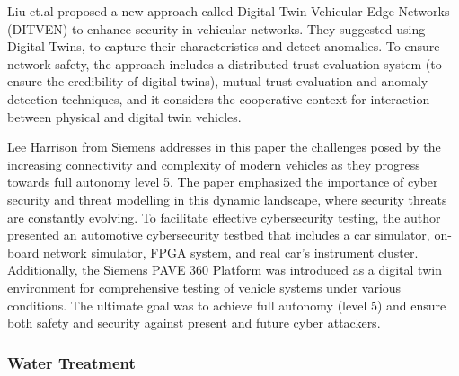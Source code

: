 Liu et.al \cite{liuDistributedCollaborativeAnomaly2021} proposed a new approach called Digital Twin Vehicular Edge Networks (DITVEN) to enhance security in vehicular networks. They suggested using Digital Twins, to capture their characteristics and detect anomalies. To ensure network safety, the approach includes a distributed trust evaluation system (to ensure the credibility of digital twins), mutual trust evaluation and anomaly detection techniques, and it considers the cooperative context for interaction between physical and digital twin vehicles.

Lee Harrison \cite{harrisonCybersecurityThreatModeling2022a} from Siemens addresses in this paper the challenges posed by the increasing connectivity and complexity of modern vehicles as they progress towards full autonomy level 5. The paper emphasized the importance of cyber security and threat modelling in this dynamic landscape, where security threats are constantly evolving. To facilitate effective cybersecurity testing, the author presented an automotive cybersecurity testbed that includes a car simulator, on-board network simulator, FPGA system, and real car's instrument cluster. Additionally, the Siemens PAVE 360 Platform was introduced as a digital twin environment for comprehensive testing of vehicle systems under various conditions. The ultimate goal was to achieve full autonomy (level 5) and ensure both safety and security against present and future cyber attackers.

\subsubsection*{Water Treatment}

